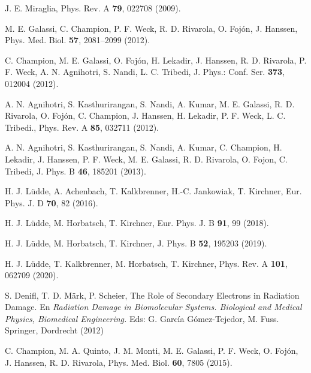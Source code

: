 \begin{thebibliography}{9}
J. E. Miraglia, 
Phys. Rev. A \textbf{79}, 022708 (2009).

M. E. Galassi, C. Champion, P. F. Weck, R. D. Rivarola, O. Fojón, J. Hanssen,
Phys. Med. Biol. \textbf{57}, 2081--2099 (2012).

C. Champion, M. E. Galassi, O. Foj\'{o}n, H. Lekadir, J. Hanssen, 
R. D. Rivarola, P. F. Weck, A. N. Agnihotri, S. Nandi, L. C. Tribedi,
J. Phys.: Conf. Ser. \textbf{373}, 012004 (2012).

A. N. Agnihotri, S. Kasthurirangan, S. Nandi, A.
Kumar, M. E. Galassi, R. D. Rivarola, O. Foj\'{o}n, C. Champion, J. Hanssen,
H. Lekadir, P. F. Weck, L. C. Tribedi.,
Phys. Rev. A \textbf{85}, 032711 (2012).

A. N. Agnihotri, S. Kasthurirangan, S. Nandi, A. Kumar, C. Champion, 
H. Lekadir, J. Hanssen, P. F. Weck, M. E. Galassi, R. D. Rivarola, 
O. Fojon, C. Tribedi, 
J. Phys. B \textbf{46}, 185201 (2013).

H. J. L\"udde, A. Achenbach, T. Kalkbrenner, H.-C. Jankowiak, T. Kirchner,
Eur. Phys. J. D \textbf{70}, 82 (2016).

H. J. L\"udde, M. Horbatsch, T. Kirchner,
Eur. Phys. J. B \textbf{91}, 99 (2018).

H. J. L\"udde, M. Horbatsch, T. Kirchner,
J. Phys. B \textbf{52}, 195203 (2019).

H. J. L\"udde, T. Kalkbrenner, M. Horbatsch, T. Kirchner,
Phys. Rev. A \textbf{101}, 062709 (2020).

S. Denifl, T. D. M\"ark, P. Scheier,
The Role of Secondary Electrons in Radiation Damage. En \textit{Radiation 
Damage in Biomolecular Systems. Biological and Medical Physics, 
Biomedical Engineering.} Eds: G. García Gómez-Tejedor, M. Fuss. 
Springer, Dordrecht (2012) 

C. Champion, M. A. Quinto, J. M. Monti, M. E. Galassi, P. F. Weck, 
O. Fojón, J. Hanssen, R. D. Rivarola, 
Phys. Med. Biol. \textbf{60}, 7805 (2015).


\end{thebibliography}
